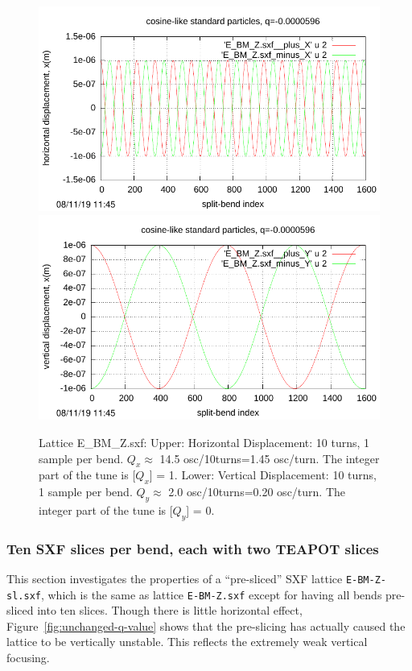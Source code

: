 \documentclass[12pt]{article}
\begin{document}
\begin{figure}[htbp]
  \includegraphics[scale=1.0]{pdf/Fig_I-3t.pdf} 
  \includegraphics[scale=1.0]{pdf/Fig_I-3b.pdf} 
\caption{Lattice E\_BM\_Z.sxf: Upper: Horizontal Displacement: 10 turns, 1 sample per bend. 
$Q_x\approx$ 14.5 osc/10turns=1.45 osc/turn. The integer part of the tune is [$Q_x$] = 1. 
Lower: Vertical Displacement: 10 turns, 1 sample per bend. 
$Q_y\approx$ 2.0 osc/10turns=0.20 osc/turn. The integer part of the tune is [$Q_y$] = 0.}
\end{figure}

\clearpage
\subsubsection{Ten SXF slices per bend, each with two TEAPOT slices\label{sect:pre-sliced}}
This section investigates the properties of a ``pre-sliced'' SXF lattice
{\tt E-BM-Z-sl.sxf}, which is the same as lattice {\tt E-BM-Z.sxf} except for having
all bends pre-sliced into ten slices. Though there is little horizontal effect,
Figure~\ref{fig:unchanged-q-value} shows that the pre-slicing has actually caused the 
lattice to be vertically unstable. This reflects the extremely weak vertical focusing.
\end{document}
